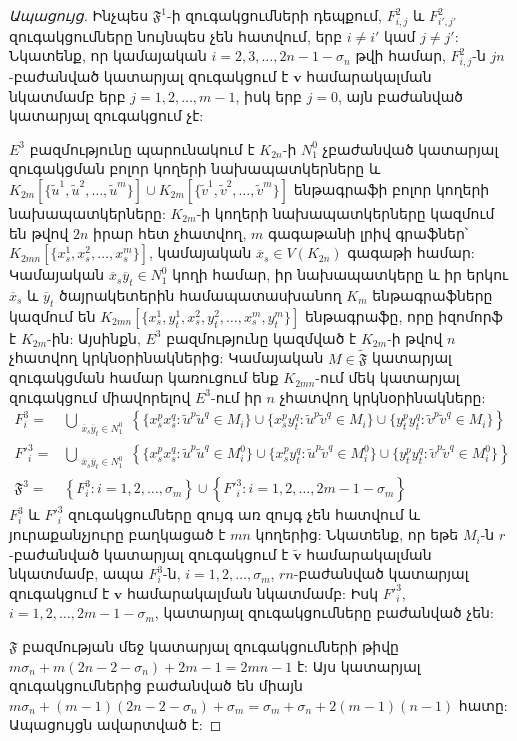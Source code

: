 \begin{hide}
\begin{proof}[Ապացույց]
Ինչպես $\mathfrak{F}^1$-ի զուգակցումների դեպքում, $F^2_{i,j}$ և $F^2_{i',j'}$ զուգակցումները նույնպես չեն հատվում, երբ $i \ne i'$ կամ $j \ne j'$: Նկատենք, որ կամայական $i=2,3,\ldots,2n-1-\sigma_n$ թվի համար, $F^2_{i,j}$-ն $jn$-բաժանված կատարյալ զուգակցում է $\mathbf{v}$ համարակալման նկատմամբ երբ $j=1,2,\ldots,m-1$, իսկ երբ $j=0$, այն բաժանված կատարյալ զուգակցում չէ:

$E^3$ բազմությունը պարունակում է $K_{2n}$-ի $N^0_1$ չբաժանված կատարյալ զուգակցման բոլոր կողերի նախապատկերները և $K_{2m}[\{\widetilde{u}^1,\widetilde{u}^2,\ldots,\widetilde{u}^m\}] \cup K_{2m}[\{\widetilde{v}^1,\widetilde{v}^2,\ldots,\widetilde{v}^m\}]$ ենթագրաֆի բոլոր կողերի նախապատկերները: $K_{2m}$-ի կողերի նախապատկերները կազմում են թվով $2n$ իրար հետ չհատվող, $m$ գագաթանի լրիվ գրաֆներ՝ $K_{2mn}\left[\{x_s^1,x_s^2,\ldots,x_s^m\}\right]$, կամայական $\overline{x}_s \in V(K_{2n})$ գագաթի համար: Կամայական $\overline{x}_s\overline{y}_t \in N^0_1$ կողի համար, իր նախապատկերը և իր երկու $\overline{x}_s$ և $\overline{y}_t$ ծայրակետերին համապատասխանող $K_{m}$ ենթագրաֆները կազմում են $K_{2mn}\left[\{x_s^1,y_t^1,x_s^2,y_t^2,\ldots,x_s^m,y_t^m\}\right]$ ենթագրաֆը, որը իզոմորֆ է $K_{2m}$-ին: Այսինքն, $E^3$ բազմությունը կազմված է $K_{2m}$-ի թվով $n$ չհատվող կրկնօրինակներից: Կամայական $M \in \widetilde{\mathfrak{F}}$ կատարյալ զուգակցման համար կառուցում ենք $K_{2mn}$-ում մեկ կատարյալ զուգակցում միավորելով $E^3$-ում իր $n$ չհատվող կրկնօրինակները: 
\begin{align*}
F^3_{i} = &
\bigcup\limits_{\substack{\overline{x}_s\overline{y}_t \in N^0_1}}
\left\{ 
\{x_s^{p}x_s^{q} : \widetilde{u}^{p}\widetilde{u}^{q} \in M_i\} 
\cup 
\{x_s^{p}y_t^{q} : \widetilde{u}^{p}\widetilde{v}^{q} \in M_i\} 
\cup
\{y_t^{p}y_t^{q} : \widetilde{v}^{p}\widetilde{v}^{q} \in M_i\} 
\right\}\\
F'^3_{i} = &
\bigcup\limits_{\substack{\overline{x}_s\overline{y}_t \in N^0_1}}
\left\{ 
\{x_s^{p}x_s^{q} : \widetilde{u}^{p}\widetilde{u}^{q} \in M^0_i\} 
\cup 
\{x_s^{p}y_t^{q} : \widetilde{u}^{p}\widetilde{v}^{q} \in M^0_i\} 
\cup
\{y_t^{p}y_t^{q} : \widetilde{v}^{p}\widetilde{v}^{q} \in M^0_i\} 
\right\}\\
\mathfrak{F}^3 = &\left\{F^3_{i} : i=1,2,\ldots,\sigma_m\right\} \cup \left\{F'^3_{i} : i=1,2,\ldots,2m-1-\sigma_m\right\}
\end{align*}
$F^3_i$ և $F'^3_i$ զուգակցումները զույգ առ զույգ չեն հատվում և յուրաքանչյուրը բաղկացած է $mn$ կողերից: Նկատենք, որ եթե $M_i$-ն $r$-բաժանված կատարյալ զուգակցում է $\widetilde{\mathbf{v}}$ համարակալման նկատմամբ, ապա $F^3_i$-ն, $i=1,2,\ldots,\sigma_m$, $rn$-բաժանված կատարյալ զուգակցում է $\mathbf{v}$ համարակալման նկատմամբ: Իսկ $F'^3_i$, $i=1,2,\ldots,2m-1-\sigma_m$, կատարյալ զուգակցումները բաժանված չեն:

$\mathfrak{F}$ բազմության մեջ կատարյալ զուգակցումների թիվը $m\sigma_n + m(2n-2-\sigma_n) + 2m-1 = 2mn-1$ է: Այս կատարյալ զուգակցումներից բաժանված են միայն $m\sigma_n + (m-1)(2n-2-\sigma_n) + \sigma_m = \sigma_m+\sigma_n+2(m-1)(n-1)$ հատը: Ապացույցն ավարտված է:
\end{proof}
\end{hide}

